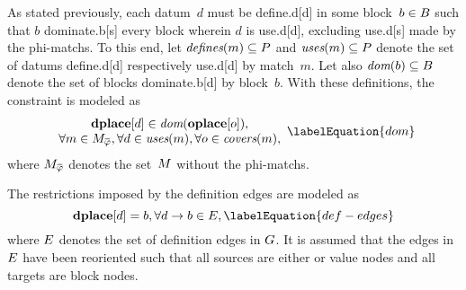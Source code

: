 As stated previously, each \gls{datum}~$d$ must be \gls{define.d}[d] in some
\gls{block}~\mbox{$b \in B$} such that $b$ \gls{dominate.b}[s] every
\gls{block} wherein $d$ is \gls{use.d}[d], excluding \gls{use.d}[s] made by the
\glspl{phi-match}.
%
To this end, let \mbox{$\operatorname{\textit{defines}}(m) \subseteq P$} and
\mbox{$\operatorname{\textit{uses}}(m) \subseteq P$} denote the set of \glspl{datum}
\gls{define.d}[d] respectively \gls{use.d}[d] by \gls{match}~$m$.
%
Let also \mbox{$\operatorname{\textit{dom}}(b) \subseteq B$} denote the set of \glspl{block}
\gls{dominate.b}[d] by \gls{block}~$b$.
%
With these definitions, the \gls{constraint} is modeled as
%
\begin{equation}
  \begin{array}{c}
    \mVar{dplace}[d] \in \mDom(\mVar{oplace}[o]), \\
    \forall m \in \mMatchCompSet{\mPhi},
    \forall d \in \mUses(m),
    \forall o \in \mCovers(m),
  \end{array}
  \labelEquation{dom}
\end{equation}
%
where $\mMatchCompSet{\mPhi}$ denotes the set~$\mMatchSet$ without the
\glspl{phi-match}.

The restrictions imposed by the \glspl{definition edge} are modeled as
%
\begin{equation}
  \mVar{dplace}[d] = b,
  \forall \mEdge{d}{b} \in \mDefEdgeSet,
  \labelEquation{def-edges}
\end{equation}
%
where $E$ denotes the set of \glspl{definition edge} in $G$.
%
It is assumed that the \glspl{edge} in $E$ have been reoriented such
that all \glspl{source} are either  or \glspl{value node}
and all \glspl{target} are \glspl{block node}.

